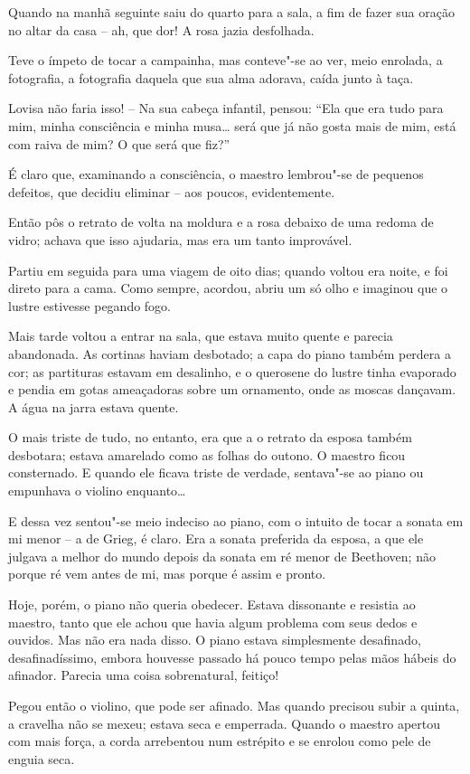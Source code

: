 Quando na manhã seguinte saiu do quarto para a sala, a fim de fazer sua
oração no altar da casa -- ah, que dor! A rosa jazia desfolhada.

Teve o ímpeto de tocar a campainha, mas conteve"-se ao ver, meio
enrolada, a fotografia, a fotografia daquela que sua alma adorava,
caída junto à taça. 

Lovisa não faria isso! -- Na sua cabeça infantil, pensou: ``Ela que era
tudo para mim, minha consciência e minha musa\ldots{} será que já não gosta
mais de mim, está com raiva de mim? O que será que fiz?''

É claro que, examinando a consciência, o maestro lembrou"-se de
pequenos defeitos, que decidiu eliminar -- aos poucos, evidentemente.

Então pôs o retrato de volta na moldura e a rosa debaixo de uma redoma
de vidro; achava que isso ajudaria, mas era um tanto improvável. 

Partiu em seguida para uma viagem de oito dias; quando voltou era noite,
e foi direto para a cama. Como sempre, acordou, abriu um só olho e
imaginou que o lustre estivesse pegando fogo.

Mais tarde voltou a entrar na sala, que estava muito quente e parecia
abandonada. As cortinas haviam desbotado; a capa do piano também
perdera a cor; as partituras estavam em desalinho, e o
querosene do lustre tinha evaporado e pendia em gotas ameaçadoras sobre
um ornamento, onde as moscas dançavam. A água na jarra estava quente.

O mais triste de tudo, no entanto, era que a o retrato da esposa também
desbotara; estava amarelado como as folhas do outono. O maestro ficou
consternado. E quando ele ficava triste de verdade, sentava"-se ao
piano ou empunhava o violino enquanto\ldots{} 

E dessa vez sentou"-se meio indeciso ao piano, com o intuito de tocar a
sonata em mi menor -- a de Grieg, é claro. Era a sonata preferida da
esposa, a que ele julgava a melhor do mundo depois da sonata em ré
menor de Beethoven; não porque ré vem antes de mi, mas porque é assim e
pronto.

Hoje, porém, o piano não queria obedecer. Estava dissonante e resistia
ao maestro, tanto que ele achou que havia algum problema com seus dedos
e ouvidos. Mas não era nada disso. O piano estava simplesmente
desafinado, desafinadíssimo, embora houvesse passado há pouco tempo
pelas mãos hábeis do afinador. Parecia uma coisa sobrenatural, feitiço!

Pegou então o violino, que pode ser afinado. Mas quando precisou subir a
quinta, a cravelha não se mexeu; estava seca e emperrada. Quando o
maestro apertou com mais força, a corda arrebentou num estrépito e se
enrolou como pele de enguia seca.

